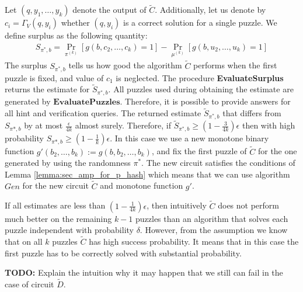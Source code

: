 Let $(q, y_1, \dots, y_k)$ denote the output of $\widetilde{C}$.
Additionally, let us denote by $c_i = \Gamma_V(q, y_i)$ whether $(q,y_i)$ is a correct solution for a single puzzle.
We define surplus as the following quantity:
\begin{align}
  \label{eq:s_pi_b}
S_{\pi^*, b} = \underset{\pi^{(k)}}{\Pr}[g(b, c_2, \dots, c_k) = 1] - \underset{\mu^{(k)}}{\Pr}[g(b, u_2, \dots, u_k) = 1]
\end{align}
The surplus $S_{\pi^*, b}$ tells us how good the algorithm $\widetilde{C}$ performs when the first puzzle is fixed, and value of $c_1$ is neglected.
The procedure \textbf{EvaluateSurplus} returns the estimate for $\widetilde{S}_{\pi^*, b}$.
All puzzles used during obtaining the estimate are generated by $\textbf{EvaluatePuzzles}$.
Therefore, it is possible to provide answers for all hint and verification queries.
The returned estimate $\widetilde{S}_{\pi^*,b}$ that differs from $S_{\pi*, b}$
by at most $\frac{\epsilon}{4k}$ almost surely.
Therefore, if $\widetilde{S}_{\pi^*,b} \geq (1-\frac{3}{4k})\epsilon$ then
with high probability $S_{\pi*,b} \geq (1-\frac{1}{k})\epsilon$.
In this case we use a new monotone binary function $g'(b_2, \dots, b_k) := g(b, b_2, \dots, b_k)$, and fix the first puzzle of $\widetilde{C}$ for the one generated
by using the randomness $\pi^*$. The new circuit satisfies the conditions of Lemma \ref{lemma:sec_amp_for_p_hash} which means that we can
use algorithm $Gen$ for the new circuit $\widetilde{C}$ and monotone function $g'$.

If all estimates are less than $(1-\frac{1}{4k})\epsilon$, then intuitively $\widetilde{C}$
does not perform much better on the remaining $k-1$ puzzles than an algorithm that solves each puzzle independent with probability $\delta$.
However, from the assumption we know that on all $k$ puzzles $\widetilde{C}$ has high success probability.
It means that in this case the first puzzle has to be correctly solved with substantial probability.

\begin{todo}
  \textbf{TODO:} Explain the intuition why it may happen that we still can fail in the case of circuit $\widetilde{D}$.
\end{todo}

